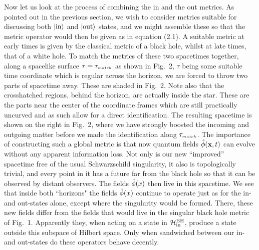 Now let us look at the process of combining the in and the out metrics.
As pointed out in the previous section, we wish to consider metrics
suitable for discussing both $\left|{\rm in}\right>$ and $\left|{\rm
out}\right>$ states, and we might assemble these so that the metric
operator would then be given as in equation (2.1). A suitable metric at
early times is given by the classical metric of a black hole, whilst at
late times, that of a white hole. To match the metrics of these two
spacetimes together, along a spacelike surface $\tau=\tau_{\ss match}$
as shown in Fig.~2, $\tau$ being some suitable time coordinate which is
regular across the horizon, we are forced to throw two parts of
spacetime away. These are shaded in Fig.~2. Note also that the
crosshatched regions, behind the horizon, are actually inside the
star.  These are the parts near the center of the coordinate frames
which are still practically uncurved and as such allow for a direct
identification.  The resulting spacetime is shown on the right in
Fig.~2, where we have strongly boosted the incoming and outgoing matter
{before we made the identification along $\tau_{\ss match}$}.  The
importance of constructing such a global metric is that now quantum
fields $\hat{\f}({\bf x},t)$ can evolve without any apparent
information loss. Not only is our new ``improved'' spacetime free of
the usual Schwarzschild singularity, it also is topologically trivial,
and every point in it has a future far from the black hole so that it
can be observed by distant observers. The fields $\hat{\f}(x)$ then
live in this spacetime. We see that inside both ``horizons" the fields
$\hat{\f}(x)$ continue to operate just as for the in- and out-states
alone, except where the singularity would be formed. There, these new
fields differ from the fields that would live in the singular black
hole metric of Fig.~1. Apparently they, when acting on a state in
$\Hin$, produce a state outside this subspace of Hilbert space. Only
when sandwiched between our in- and out-states do these operators
behave decently.

